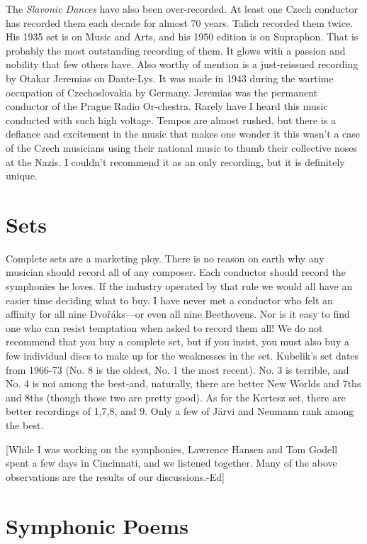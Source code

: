 \documentclass[12pt]{article}%
\begin{document}
The {\it Slavonic Dances} have also been over-recorded. At least one Czech conductor has recorded them each decade for almost 70 years.
Talich recorded them twice. His 1935 set is on Music and Arts, and his 1950 edition is on Supraphon. That is probably the most outstanding recording of them. It glows with a passion and nobility that few others have. Also worthy of mention is a just-reissued recording by Otakar Jeremias on Dante-Lys. It was made in 1943 during the wartime occupation of Czechoslovakia by Germany. Jeremias was the permanent conductor of the Prague Radio Or-chestra. Rarely have I heard this music conducted with such high voltage. Tempos are almost rushed, but there is a defiance and excitement in the music that makes one wonder it this wasn't a case of the Czech musicians using their national music to thumb their collective noses at the Nazis. I couldn't recommend it as an only recording, but it is definitely unique.

\section{Sets}

Complete sets are a marketing ploy. There is no reason on earth why any musician should record all of any composer. Each conductor should record the symphonies he loves. If the industry operated by that rule we would all have an easier time deciding what to buy. I have never met a conductor who felt an affinity for all nine Dvořáks---or even all nine Beethovens.
Nor is it easy to find one who can resist temptation when asked to record them all!
We do not recommend that you buy a complete set, but if you insist, you must also buy a few individual discs to make up for the weaknesses in the set. Kubelik's set dates from 1966-73 (No. 8 is the oldest, No. 1 the most recent). No. 3 is terrible, and No. 4 is noi among the best-and, naturally, there are better New Worlds and 7ths and 8ths (though those two are pretty good). As for the Kertesz set, there are better recordings of 1,7,8, and 9.
Only a few of Järvi and Neumann rank among the best.

[While I was working on the symphonies, Lawrence Hansen and Tom Godell spent a few days in Cincinnati, and we listened together.
Many of the above observations are the results of our discussions.-Ed]

\section{Symphonic Poems}
\end{document}
